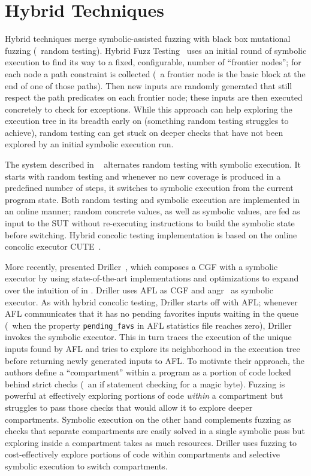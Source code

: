 \section{Hybrid Techniques}
Hybrid techniques merge symbolic-assisted fuzzing with black box mutational
fuzzing (\ie~random testing). Hybrid Fuzz Testing~\cite{pak2012hybrid} uses an
initial round of symbolic execution to find its way to a fixed, configurable,
number of ``frontier nodes''; for each node a path constraint is collected
(\ie~a frontier node is the basic block at the end of one of those paths). Then
new inputs are randomly generated that still respect the path predicates on each
frontier node; these inputs are then executed concretely to check for
exceptions. While this approach can help exploring the execution tree in its
breadth early on (something random testing struggles to achieve), random testing
can get stuck on deeper checks that have not been explored by an initial
symbolic execution run.

The system described in ~\cite{majumdar2007hybrid}
alternates random testing with symbolic execution. It starts with random testing
and whenever no new coverage is produced in a predefined number of steps, it
switches to symbolic execution from the current program state. Both random
testing and symbolic execution are implemented in an online manner; random
concrete values, as well as symbolic values, are fed as input to the \ac{SUT}
without re-executing instructions to build the symbolic state before switching.
Hybrid concolic testing implementation is based on the online concolic executor
CUTE~\cite{Sen2005CUTEAC}.

More recently, \citeauthor{stephens2016driller} presented
Driller~\cite{stephens2016driller}, which composes a \ac{CGF} with a symbolic
executor by using state-of-the-art implementations and optimizations to expand
over the intuition of \citeauthor{majumdar2007hybrid} in
. Driller uses AFL as \ac{CGF} and
angr~\cite{shoshitaishvili2016sok} as symbolic executor. As with hybrid concolic
testing, Driller starts off with AFL; whenever AFL communicates that it has no
pending favorites inputs waiting in the queue (\ie~when the property
\texttt{pending\_favs} in AFL statistics file reaches zero), Driller invokes the
symbolic executor. This in turn traces the execution of the unique inputs found
by AFL and tries to explore its neighborhood in the execution tree before
returning newly generated inputs to AFL\@. To motivate their approach, the
authors define a ``compartment'' within a program as a portion of code locked
behind strict checks (\eg~an if statement checking for a magic byte). Fuzzing is
powerful at effectively exploring portions of code \emph{within} a compartment
but struggles to pass those checks that would allow it to explore deeper
compartments. Symbolic execution on the other hand complements fuzzing as checks
that separate compartments are easily solved in a single symbolic pass but
exploring inside a compartment takes as much resources. Driller uses fuzzing to
cost-effectively explore portions of code within compartments and selective
symbolic execution to switch compartments.

